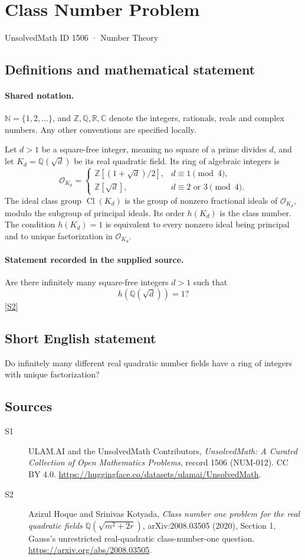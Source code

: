\documentclass[11pt]{article}
\newcommand{\sref}[2]{\hyperlink{source:#1:#2}{[S#2]}}
\begin{document}
\setcounter{section}{1505}
\section{Class Number Problem}\label{1506}
{\small\sffamily UnsolvedMath ID 1506 · Number Theory}
\subsection{Definitions and mathematical statement}

\paragraph{Shared notation.}$\mathbb N=\{1,2,\ldots\}$, and $\mathbb Z,\mathbb Q,\mathbb R,\mathbb C$ denote the integers, rationals, reals and complex numbers. Any other conventions are specified locally.


Let \(d>1\) be a square-free integer, meaning no square of a
prime divides \(d\), and let \(K_d=\mathbb Q(\sqrt d)\) be its
real quadratic field. Its ring of algebraic integers is
\[
 \mathcal O_{K_d}=\begin{cases}
   \mathbb Z[(1+\sqrt d)/2],&d\equiv1\pmod4,\\
   \mathbb Z[\sqrt d],&d\equiv2\text{ or }3\pmod4.
 \end{cases}
\]
The ideal class group \(\operatorname{Cl}(K_d)\) is the group
of nonzero fractional ideals of \(\mathcal O_{K_d}\), modulo
the subgroup of principal ideals. Its order \(h(K_d)\) is the class number.
The condition \(h(K_d)=1\) is equivalent to every nonzero ideal
being principal and to unique factorization in \(\mathcal O_{K_d}\).
\paragraph{Statement recorded in the supplied source.}
Are there infinitely many square-free integers \(d>1\)
such that
\[
                          h(\mathbb Q(\sqrt d))=1?
\] \sref{1506}{2}
\subsection{Short English statement}
Do infinitely many different real quadratic number fields have a ring of integers with unique factorization?
\subsection{Sources}
\begin{description}
\item[\hypertarget{source:1506:1}{S1}] ULAM.AI and the UnsolvedMath Contributors, \emph{UnsolvedMath: A Curated Collection of Open Mathematics Problems}, record 1506 (NUM-012). CC BY 4.0. \url{https://huggingface.co/datasets/ulamai/UnsolvedMath}.
\item[\hypertarget{source:1506:2}{S2}] Azizul Hoque and Srinivas Kotyada, \emph{Class number one problem for the real quadratic fields $\mathbb Q(\sqrt{m^2+2r})$}, arXiv:2008.03505 (2020), Section 1, Gauss's unrestricted real-quadratic class-number-one question. \url{https://arxiv.org/abs/2008.03505}.
\end{description}
\label{end:1506}
\end{document}
